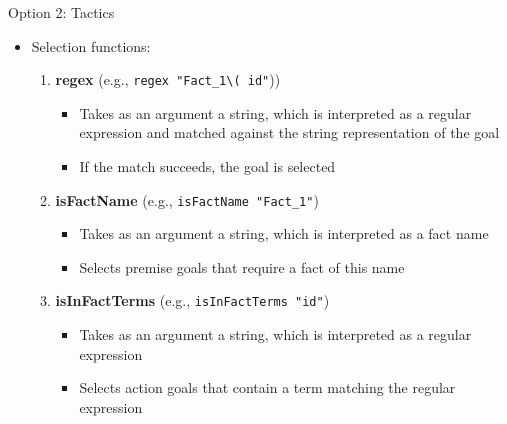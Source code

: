 \documentclass[11pt,aspectratio=169]{beamer}
\begin{document}
\begin{frame}[fragile]{Option 2: Tactics}
    \begin{itemize}
        \item Selection functions:
        \begin{enumerate}
            \item \textbf{regex}
                  (e.g., \verb|regex "Fact_1\( |\tildelow{}\verb|id"|))
            \begin{itemize}
                \item Takes as an argument a string, which is interpreted as a 
                      regular expression and matched against the string 
                      representation of the goal
                \item If the match succeeds, the goal is selected
            \end{itemize}
            \item \textbf{isFactName} (e.g., \verb|isFactName "Fact_1"|)
            \begin{itemize}
                \item Takes as an argument a string, which is interpreted as a 
                      fact name
                \item Selects premise goals that require a fact of this name
            \end{itemize}
            \item \textbf{isInFactTerms}
                  (e.g., \verb|isInFactTerms "|\tildelow{}\verb|id"|)
            \begin{itemize}
                \item Takes as an argument a string, which is interpreted as a 
                      regular expression
                \item Selects action goals that contain a term matching the 
                      regular expression
            \end{itemize}
        \end{enumerate}
    \end{itemize}
\end{frame}
\end{document}
